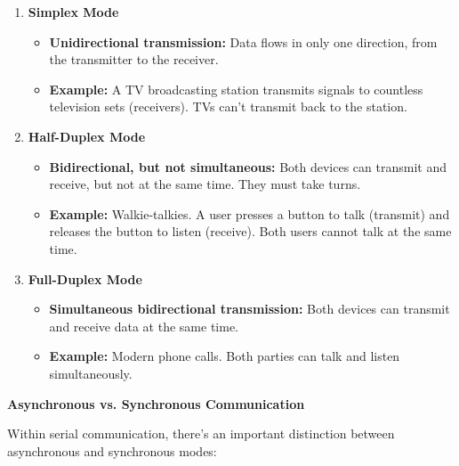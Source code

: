 \documentclass[
]{article}
\begin{document}
\begin{enumerate}
\def\labelenumi{\arabic{enumi}.}
\item
  \textbf{Simplex Mode}

  \begin{itemize}
  \item
    \textbf{Unidirectional transmission:} Data flows in only one
    direction, from the transmitter to the receiver.
  \item
    \textbf{Example:} A TV broadcasting station transmits signals to
    countless television sets (receivers). TVs can't transmit back to
    the station.
  \end{itemize}
\item
  \textbf{Half-Duplex Mode}

  \begin{itemize}
  \item
    \textbf{Bidirectional, but not simultaneous:} Both devices can
    transmit and receive, but not at the same time. They must take
    turns.
  \item
    \textbf{Example:} Walkie-talkies. A user presses a button to talk
    (transmit) and releases the button to listen (receive). Both users
    cannot talk at the same time.
  \end{itemize}
\item
  \textbf{Full-Duplex Mode}

  \begin{itemize}
  \item
    \textbf{Simultaneous bidirectional transmission:} Both devices can
    transmit and receive data at the same time.
  \item
    \textbf{Example:} Modern phone calls. Both parties can talk and
    listen simultaneously.
  \end{itemize}
\end{enumerate}

\textbf{Asynchronous vs. Synchronous Communication}

Within serial communication, there's an important distinction between
asynchronous and synchronous modes:
\end{document}
